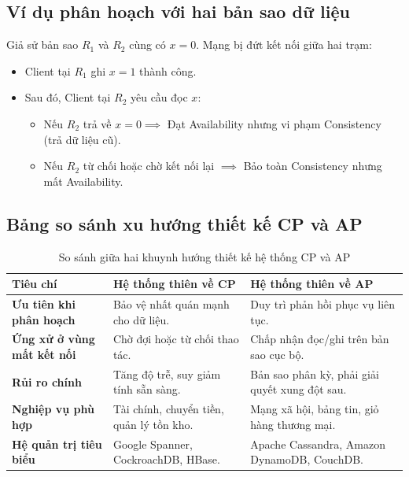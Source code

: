 \documentclass[12pt,a4paper]{report}
\begin{document}
\subsection{Ví dụ phân hoạch với hai bản sao dữ liệu}
Giả sử bản sao $R_1$ và $R_2$ cùng có $x = 0$. Mạng bị đứt kết nối giữa hai trạm:
\begin{itemize}[leftmargin=0.8cm, topsep=1pt, itemsep=1pt]
    \item Client tại $R_1$ ghi $x = 1$ thành công.
    \item Sau đó, Client tại $R_2$ yêu cầu đọc $x$:
    \begin{itemize}
        \item Nếu $R_2$ trả về $x = 0 \implies$ Đạt Availability nhưng vi phạm Consistency (trả dữ liệu cũ).
        \item Nếu $R_2$ từ chối hoặc chờ kết nối lại $\implies$ Bảo toàn Consistency nhưng mất Availability.
    \end{itemize}
\end{itemize}

\subsection{Bảng so sánh xu hướng thiết kế CP và AP}

\begin{table}[!ht]
\centering
\small
\caption{So sánh giữa hai khuynh hướng thiết kế hệ thống CP và AP}
\label{tab:cp_vs_ap}
\renewcommand{\arraystretch}{1.25}
\begin{tabularx}{\textwidth}{|>{\raggedright\arraybackslash\bfseries}p{3cm}|>{\raggedright\arraybackslash}X|>{\raggedright\arraybackslash}X|}
\hline
\textbf{Tiêu chí} & \textbf{Hệ thống thiên về CP} & \textbf{Hệ thống thiên về AP} \\ \hline
Ưu tiên khi phân hoạch & Bảo vệ nhất quán mạnh cho dữ liệu. & Duy trì phản hồi phục vụ liên tục. \\ \hline
Ứng xử ở vùng mất kết nối & Chờ đợi hoặc từ chối thao tác. & Chấp nhận đọc/ghi trên bản sao cục bộ. \\ \hline
Rủi ro chính & Tăng độ trễ, suy giảm tính sẵn sàng. & Bản sao phân kỳ, phải giải quyết xung đột sau. \\ \hline
Nghiệp vụ phù hợp & Tài chính, chuyển tiền, quản lý tồn kho. & Mạng xã hội, bảng tin, giỏ hàng thương mại. \\ \hline
Hệ quản trị tiêu biểu & Google Spanner, CockroachDB, HBase. & Apache Cassandra, Amazon DynamoDB, CouchDB. \\ \hline
\end{tabularx}
\end{table}
\end{document}
